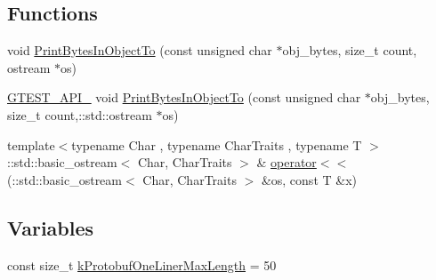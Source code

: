 \subsection*{\-Functions}
\begin{DoxyCompactItemize}
\item 
void \hyperlink{namespacetesting_1_1internal2_abfb9aa80365f93b952e9a4bea09947a8}{\-Print\-Bytes\-In\-Object\-To} (const unsigned char $\ast$obj\-\_\-bytes, size\-\_\-t count, ostream $\ast$os)
\item 
\hyperlink{gtest-port_8h_aa73be6f0ba4a7456180a94904ce17790}{\-G\-T\-E\-S\-T\-\_\-\-A\-P\-I\-\_\-} void \hyperlink{namespacetesting_1_1internal2_ae0307663d024e64f6a768500abee372a}{\-Print\-Bytes\-In\-Object\-To} (const unsigned char $\ast$obj\-\_\-bytes, size\-\_\-t count,\-::std\-::ostream $\ast$os)
\item 
{\footnotesize template$<$typename Char , typename Char\-Traits , typename T $>$ }\\\-::std\-::basic\-\_\-ostream$<$ \-Char, \*
\-Char\-Traits $>$ \& \hyperlink{namespacetesting_1_1internal2_a57051950764f935850c17ad7ae7bc65b}{operator$<$$<$} (\-::std\-::basic\-\_\-ostream$<$ \-Char, \-Char\-Traits $>$ \&os, const \-T \&x)
\end{DoxyCompactItemize}
\subsection*{\-Variables}
\begin{DoxyCompactItemize}
\item 
const size\-\_\-t \hyperlink{namespacetesting_1_1internal2_a11cfb2a8b08f10a62ea02a1ea23044d0}{k\-Protobuf\-One\-Liner\-Max\-Length} = 50
\end{DoxyCompactItemize}


